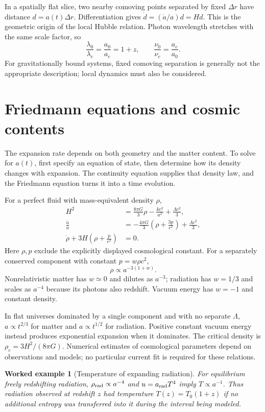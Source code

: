 \documentclass[11pt,oneside]{book}
\theoremstyle{reviewstyle}
\newtheorem{example}{Worked example}[chapter]
\begin{document}
In a spatially flat slice, two nearby comoving points separated by fixed $\Delta r$ have distance $d=a(t)\Delta r$. Differentiation gives $\dot d=(\dot a/a)d=Hd$. This is the geometric origin of the local Hubble relation. Photon wavelength stretches with the same scale factor, so
\begin{equation}
\frac{\lambda_0}{\lambda_e}=\frac{a_0}{a_e}=1+z,
\qquad \frac{\nu_0}{\nu_e}=\frac{a_e}{a_0}.
\end{equation}
For gravitationally bound systems, fixed comoving separation is generally not the appropriate description; local dynamics must also be considered.

\section{Friedmann equations and cosmic contents}
The expansion rate depends on both geometry and the matter content. To solve for $a(t)$, first specify an equation of state, then determine how its density changes with expansion. The continuity equation supplies that density law, and the Friedmann equation turns it into a time evolution.

For a perfect fluid with mass-equivalent density $\rho$,
\begin{align}
H^2&=\frac{8\pi G}{3}\rho-\frac{kc^2}{a^2}+\frac{\Lambda c^2}{3},\\
\frac{\ddot a}{a}&=-\frac{4\pi G}{3}\left(\rho+\frac{3p}{c^2}\right)+\frac{\Lambda c^2}{3},\\
\dot\rho+3H\left(\rho+\frac p{c^2}\right)&=0.
\end{align}
Here $\rho,p$ exclude the explicitly displayed cosmological constant. For a separately conserved component with constant $p=w\rho c^2$,
\begin{equation}\rho\propto a^{-3(1+w)}.\end{equation}
Nonrelativistic matter has $w\simeq0$ and dilutes as $a^{-3}$; radiation has $w=1/3$ and scales as $a^{-4}$ because its photons also redshift. Vacuum energy has $w=-1$ and constant density.

In flat universes dominated by a single component and with no separate $\Lambda$, $a\propto t^{2/3}$ for matter and $a\propto t^{1/2}$ for radiation. Positive constant vacuum energy instead produces exponential expansion when it dominates. The critical density is $\rho_c=3H^2/(8\pi G)$. Numerical estimates of cosmological parameters depend on observations and models; no particular current fit is required for these relations.
\begin{example}[Temperature of expanding radiation]
For equilibrium freely redshifting radiation, $\rho_{\rm rad}\propto a^{-4}$ and $u=a_{\rm rad}T^4$ imply $T\propto a^{-1}$. Thus radiation observed at redshift $z$ had temperature $T(z)=T_0(1+z)$ if no additional entropy was transferred into it during the interval being modeled.
\end{example}
\end{document}
